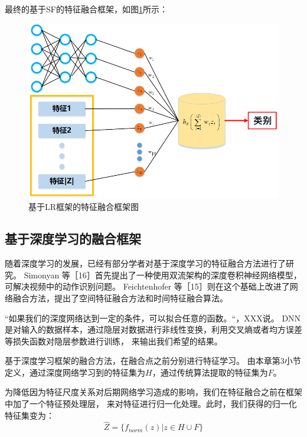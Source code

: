 最终的基于SF的特征融合框架，如图\ref{sec:fig_4_2}所示：\par
\begin{figure}[!h]
	\centering
	\includegraphics[scale=0.7]{figures/chapter_4/fig_4_2}
	\caption{基于LR框架的特征融合框架图}\label{sec:fig_4_2}
\end{figure}


\subsection{基于深度学习的融合框架}
随着深度学习的发展，已经有部分学者对基于深度学习的特征融合方法进行了研究。
Simonyan 等［16］首先提出了一种使用双流架构的深度卷积神经网络模型，可解决视频中的动作识别问题。
Feichtenhofer 等［15］则在这个基础上改进了网络融合方法，提出了空间特征融合方法和时间特征融合算法。\par

“如果我们的深度网络达到一定的条件，可以拟合任意的函数。“，XXX说。
DNN是对输入的数据样本，通过隐层对数据进行非线性变换，利用交叉熵或者均方误差等损失函数对隐层参数进行训练，
来输出我们希望的结果。\par

基于深度学习框架的融合方法，在融合点之前分别进行特征学习。
由本章第3小节定义，通过深度网络学习到的特征集为$H$，通过传统算法提取的特征集为$F$。\par

为降低因为特征尺度关系对后期网络学习造成的影响，我们在特征融合之前在框架中加了一个特征预处理层，
来对特征进行归一化处理。此时，我们获得的归一化特征集变为：
\begin{equation}
	\label{eqt_4_22}
	\hat{Z} =\{ f_{norm}(z) | z \in H \cup F \}
\end{equation}

